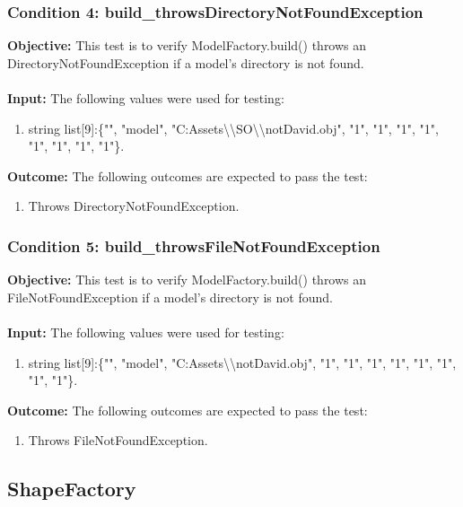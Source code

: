 \documentclass[a4paper,12pt]{article}
\begin{document}
		\subsubsection{Condition 4: build\_throwsDirectoryNotFoundException}
			\textbf{Objective:} This test is to verify ModelFactory.build() throws an DirectoryNotFoundException if a model's directory is not found.\\\\
			\textbf{Input:} The following values were used for testing:
				\begin{enumerate}
					\item string list[9]:\{"", "model", "C:Assets\textbackslash \textbackslash SO\textbackslash \textbackslash notDavid.obj", "1", "1", "1", "1", "1", "1", "1", "1"\}.
				\end{enumerate}
			\textbf{Outcome:} The following outcomes are expected to pass the test:
				\begin{enumerate}
					\item Throws DirectoryNotFoundException.
				\end{enumerate}
		\subsubsection{Condition 5: build\_throwsFileNotFoundException}
			\textbf{Objective:} This test is to verify  ModelFactory.build() throws an FileNotFoundException if a model's directory is not found.\\\\
			\textbf{Input:} The following values were used for testing:
				\begin{enumerate}
					\item string list[9]:\{"", "model", "C:Assets\textbackslash \textbackslash notDavid.obj", "1", "1", "1", "1", "1", "1", "1", "1"\}.
				\end{enumerate}
			\textbf{Outcome:} The following outcomes are expected to pass the test:
				\begin{enumerate}
					\item Throws FileNotFoundException.
				\end{enumerate}
	\subsection{ShapeFactory}
\end{document}
